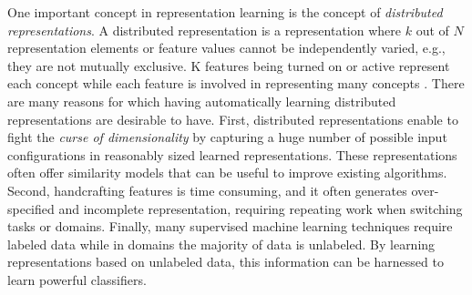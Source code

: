 One important  concept in representation learning  is the concept of
\textit{distributed representations}.  A distributed representation is a representation  where $k$ 
out of $N$ representation elements or feature values cannot  be independently
varied, e.g., they are not mutually exclusive. K features being turned on or
active represent each concept while each feature is involved 
in representing many concepts \cite{DBLP:journals/corr/abs-1206-5538}.
There are many reasons for which having automatically learning distributed representations are
desirable to have.  First,  distributed representations enable to fight the \textit{ curse of
dimensionality} by capturing a huge number of possible input configurations in
reasonably sized learned representations. These representations often offer
similarity models that can be useful to improve existing algorithms.
Second,  handcrafting features is time consuming, and it often generates
over-specified and incomplete representation, requiring repeating  work when
switching tasks or  domains. Finally, many supervised  machine learning techniques
require labeled data while in domains the majority of data is unlabeled.  By learning
representations based on unlabeled data, this information can be harnessed
to learn powerful classifiers.















